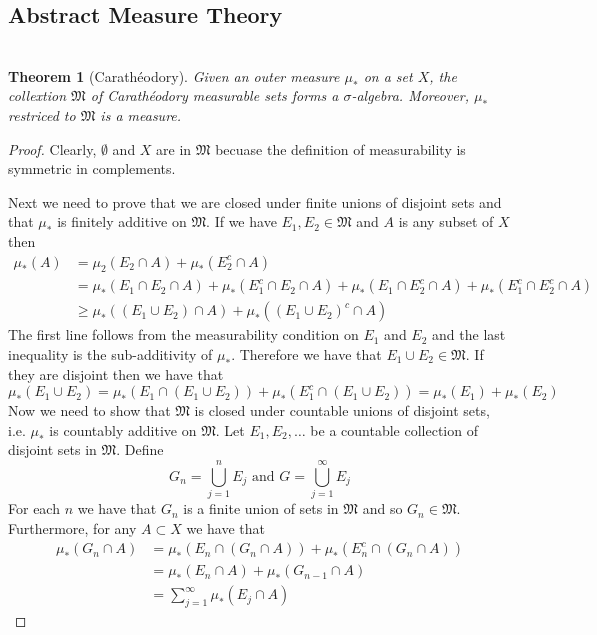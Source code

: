 \documentclass{article}
\newtheorem*{thm}{\\ Theorem}
\begin{document}
\subsection{Abstract Measure Theory}
\begin{thm}[Carath\'{e}odory]
  Given an outer measure $\mu_*$ on a set $X$, the collextion $\mathfrak{M}$
  of Carath\'{e}odory measurable sets forms a $\sigma$-algebra. Moreover,
  $\mu_*$ restriced to $\mathfrak{M}$ is a measure.
\end{thm}
\begin{proof}
  Clearly, $\emptyset$ and $X$ are in $\mathfrak{M}$ becuase the definition
  of measurability is symmetric in complements.

  Next we need to prove that we are closed under finite unions of disjoint
  sets and that $\mu_*$ is finitely additive on $\mathfrak{M}$. If we have
  $E_1, E_2 \in \mathfrak{M}$ and $A$ is any subset of $X$ then
  \begin{align*}
    \mu_*(A) &= \mu_2(E_2 \cap A) + \mu_*(E_2^c \cap A) \\
    &= \mu_*(E_1 \cap E_2 \cap A) + \mu_*(E_1^c \cap E_2 \cap A) +
    \mu_*(E_1 \cap E_2^c \cap A) + \mu_*(E_1^c \cap E_2^c \cap A) \\
    &\geq \mu_*((E_1 \cup E_2) \cap A) + \mu_*((E_1 \cup E_2)^c \cap A)
  \end{align*}
  The first line follows from the measurability condition on $E_1$ and $E_2$
  and the last inequality is the sub-additivity of $\mu_*$. Therefore we
  have that $E_1 \cup E_2 \in \mathfrak{M}$. If they are disjoint then we
  have that
  \[
  \mu_*(E_1 \cup E_2) = \mu_*(E_1 \cap (E_1 \cup E_2)) + \mu_*(E_1^c \cap
  (E_1 \cup E_2)) = \mu_*(E_1) + \mu_*(E_2)
  \]
  Now we need to show that $\mathfrak{M}$ is closed under countable unions
  of disjoint sets, i.e. $\mu_*$ is countably additive on $\mathfrak{M}$.
  Let $E_1, E_2, \ldots$ be a countable collection of disjoint sets in
  $\mathfrak{M}$. Define
  \[
  G_n = \bigcup_{j=1}^n E_j \text{ and } G = \bigcup_{j=1}^\infty E_j
  \]
  For each $n$ we have that $G_n$ is a finite union of sets in
  $\mathfrak{M}$ and so $G_n \in \mathfrak{M}$. Furthermore, for any
  $A \subset X$ we have that
  \begin{align*}
    \mu_*(G_n\cap A) &= \mu_*(E_n \cap (G_n \cap A)) +
    \mu_*(E_n^c \cap (G_n \cap A)) \\
    &= \mu_*(E_n \cap A) + \mu_*(G_{n-1} \cap A) \\
    &= \sum_{j=1}^\infty \mu_*(E_j \cap A)
  \end{align*}

\end{proof}
\end{document}
